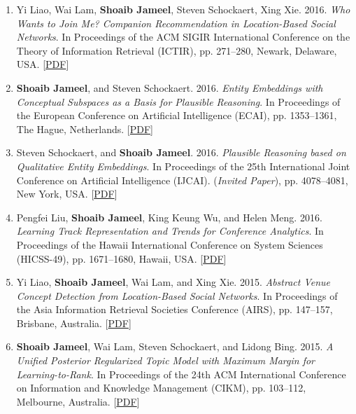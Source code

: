 \documentclass[margin]{res}
\begin{document}
\begin{resume}
\begin{enumerate}
\item Yi Liao, Wai Lam, \textbf{Shoaib Jameel}, Steven Schockaert, Xing Xie. 2016. \textit{Who Wants to Join Me? Companion Recommendation in Location-Based Social Networks}. In Proceedings of the ACM SIGIR International Conference on the Theory of Information Retrieval (ICTIR), pp. 271--280, Newark, Delaware, USA. [\href{https://drive.google.com/open?id=1iPLZ8EDQaQYkjpZ6FTlK9ZPksf_Ki8wN}{PDF}] \newline

\item \textbf{Shoaib Jameel}, and Steven Schockaert. 2016. \textit{Entity Embeddings with Conceptual Subspaces as a Basis for Plausible Reasoning}. In Proceedings of the European Conference on Artificial Intelligence (ECAI), pp. 1353--1361, The Hague, Netherlands. [\href{https://arxiv.org/abs/1602.05765}{PDF}] \newline

\item Steven Schockaert, and \textbf{Shoaib Jameel}. 2016. \textit{Plausible Reasoning based on Qualitative Entity Embeddings}. In Proceedings of the 25th International Joint Conference on Artificial Intelligence (IJCAI). (\textit{Invited Paper}), pp. 4078--4081, New York, USA. [\href{https://ijcai.org/proceedings/2016/0605.pdf}{PDF}] \newline

\item Pengfei Liu, \textbf{Shoaib Jameel}, King Keung Wu, and Helen Meng. 2016. \textit{Learning Track Representation and Trends for Conference Analytics}. In Proceedings of the Hawaii International Conference on System Sciences (HICSS-49), pp. 1671--1680, Hawaii, USA. [\href{https://drive.google.com/file/d/1mRGqiIsAY1hFgvnr5zSQ_m5c0FTgDuZQ/view?usp=sharing}{PDF}]  \newline

\item Yi Liao, \textbf{Shoaib Jameel}, Wai Lam, and Xing Xie. 2015. \textit{Abstract Venue Concept Detection from Location-Based Social Networks}. In Proceedings of the Asia Information Retrieval Societies Conference (AIRS), pp. 147--157, Brisbane, Australia. [\href{https://drive.google.com/file/d/1aRgJWZJPdfd_cMPB7IucGDO9FQIJ-SFG/view?usp=sharing}{PDF}]  \newline

\item \textbf{Shoaib Jameel}, Wai Lam, Steven Schockaert, and Lidong Bing. 2015. \textit{A Unified Posterior Regularized Topic Model with Maximum Margin for Learning-to-Rank}. In Proceedings of the 24th ACM International Conference on Information and Knowledge Management (CIKM), pp. 103--112, Melbourne, Australia. [\href{https://drive.google.com/file/d/1FlUuVeUd0eSb7aNrdJZgm5LdRKLvNDDT/view?usp=sharing}{PDF}]  \newline


\end{enumerate}
\end{resume}
\end{document}
